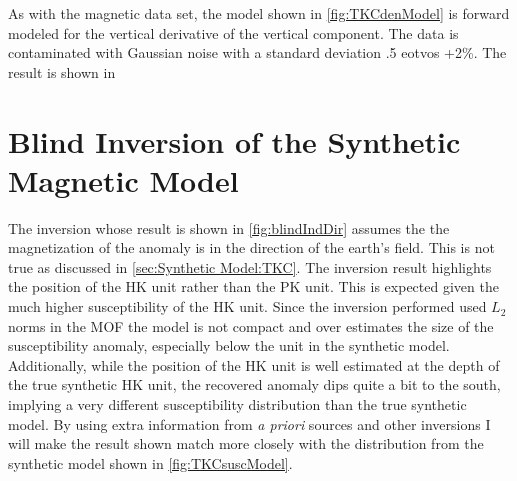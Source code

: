 As with the magnetic data set, the model shown in  \autoref{fig:TKCdenModel} is forward modeled for the vertical derivative of the vertical component. The data is contaminated with Gaussian noise with a standard deviation .5 eotvos +2\%. The result is shown in 


\FloatBarrier
\section{Blind Inversion of the Synthetic Magnetic Model}
\label{sec:Blind Inversion of the Synthetic Magnetic Model:TKC}

The inversion whose result is shown in \autoref{fig:blindIndDir} assumes the the magnetization of the anomaly is in the direction of the earth's field. This is not true as discussed in \autoref{sec:Synthetic Model:TKC}. The inversion result highlights the position of the HK unit rather than the PK unit. This is expected given the much higher susceptibility of the HK unit. Since the inversion performed used $L_2$ norms in the \ac{MOF} the model is not compact and over estimates the size of the susceptibility anomaly, especially below the unit in the synthetic model. Additionally, while the position of the HK unit is well estimated at the depth of the true synthetic HK unit, the recovered anomaly dips quite a bit to the south, implying a very different susceptibility distribution than the true synthetic model. By using extra information from \emph{a priori} sources and other inversions I will make the result shown match more closely with the distribution from the synthetic model shown in \autoref{fig:TKCsuscModel}.

